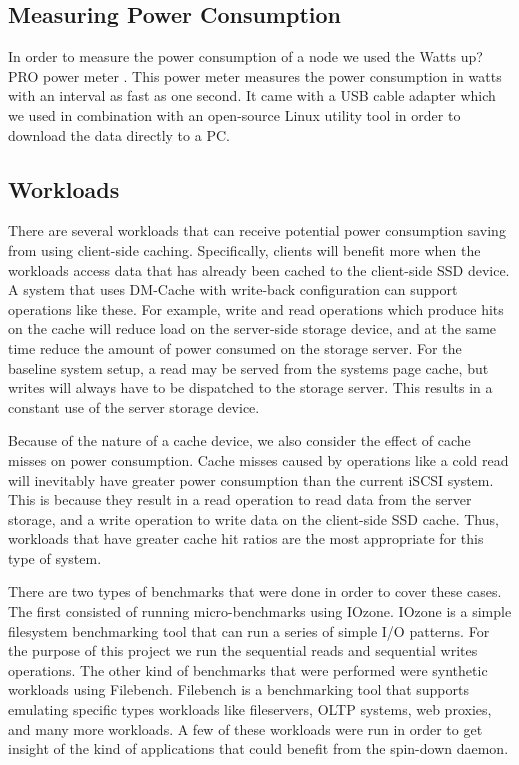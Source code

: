 \subsection{Measuring Power Consumption}

In order to measure the power consumption of a node we used the Watts up? PRO
power meter \cite{wattsup}. This power meter measures the power consumption in
watts with an interval as fast as one second. It came with a USB cable adapter
which we used in combination with an open-source Linux utility tool in order to
download the data directly to a PC.

\subsection{Workloads}

There are several workloads that can receive potential power consumption saving
from using client-side caching. Specifically, clients will benefit more when the
workloads access data that has already been cached to the client-side SSD
device. A system that uses DM-Cache with write-back configuration can support
operations like these. For example, write and read operations which produce hits
on the cache will reduce load on the server-side storage device, and at the same
time reduce the amount of power consumed on the storage server. For the baseline
system setup, a read may be served from the systems page cache, but writes will
always have to be dispatched to the storage server. This results in a constant
use of the server storage device.

Because of the nature of a cache device, we also consider the effect of cache
misses on power consumption. Cache misses caused by operations like a cold read
will inevitably have greater power consumption than the current iSCSI
system. This is because they result in a read operation to read data from the
server storage, and a write operation to write data on the client-side SSD
cache. Thus, workloads that have greater cache hit ratios are the most
appropriate for this type of system.

There are two types of benchmarks that were done in order to cover these cases.
The first consisted of running micro-benchmarks using IOzone. IOzone is a simple
filesystem benchmarking tool that can run a series of simple I/O patterns. For
the purpose of this project we run the sequential reads and sequential writes
operations.  The other kind of benchmarks that were performed were synthetic
workloads using Filebench. Filebench is a benchmarking tool that supports
emulating specific types workloads like fileservers, OLTP systems, web proxies,
and many more workloads. A few of these workloads were run in order to get
insight of the kind of applications that could benefit from the spin-down
daemon.

